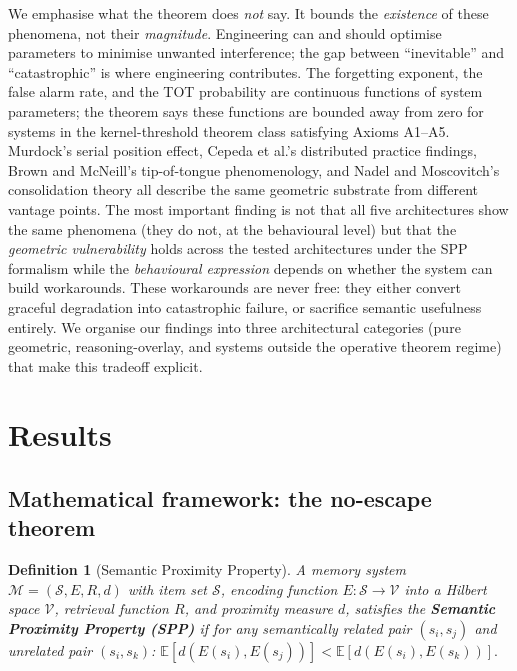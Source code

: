 \documentclass[11pt]{article}
\newtheorem{definition}{Definition}
\begin{document}
We emphasise what the theorem does \textit{not} say. It bounds the \textit{existence} of these phenomena, not their \textit{magnitude}. Engineering can and should optimise parameters to minimise unwanted interference; the gap between ``inevitable'' and ``catastrophic'' is where engineering contributes. The forgetting exponent, the false alarm rate, and the TOT probability are continuous functions of system parameters; the theorem says these functions are bounded away from zero for systems in the kernel-threshold theorem class satisfying Axioms A1--A5. Murdock's serial position effect\cite{murdock1962}, Cepeda et al.'s\cite{cepeda2006} distributed practice findings, Brown and McNeill's\cite{brown1966} tip-of-tongue phenomenology, and Nadel and Moscovitch's\cite{nadel1997} consolidation theory all describe the same geometric substrate from different vantage points. The most important finding is not that all five architectures show the same phenomena (they do not, at the behavioural level) but that the \textit{geometric vulnerability} holds across the tested architectures under the SPP formalism while the \textit{behavioural expression} depends on whether the system can build workarounds. These workarounds are never free: they either convert graceful degradation into catastrophic failure, or sacrifice semantic usefulness entirely. We organise our findings into three architectural categories (pure geometric, reasoning-overlay, and systems outside the operative theorem regime) that make this tradeoff explicit.

\section*{Results}

\subsection*{Mathematical framework: the no-escape theorem}

\begin{definition}[Semantic Proximity Property]
A memory system $\mathcal{M} = (\mathcal{S}, E, R, d)$ with item set $\mathcal{S}$, encoding function $E: \mathcal{S} \to \mathcal{V}$ into a Hilbert space $\mathcal{V}$, retrieval function $R$, and proximity measure $d$, satisfies the \textbf{Semantic Proximity Property (SPP)} if for any semantically related pair $(s_i, s_j)$ and unrelated pair $(s_i, s_k)$:
$\mathbb{E}[d(E(s_i), E(s_j))] < \mathbb{E}[d(E(s_i), E(s_k))].$
\end{definition}
\end{document}
